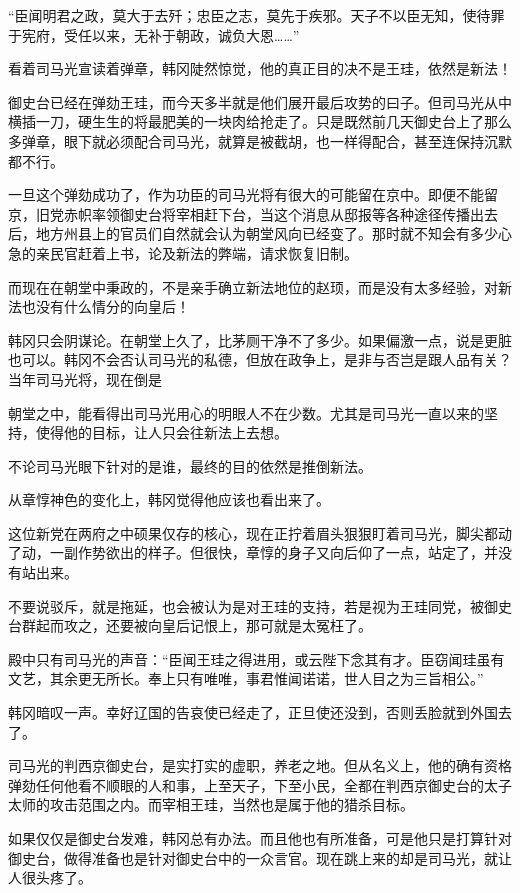 “臣闻明君之政，莫大于去歼；忠臣之志，莫先于疾邪。天子不以臣无知，使待罪于宪府，受任以来，无补于朝政，诚负大恩……”

看着司马光宣读着弹章，韩冈陡然惊觉，他的真正目的决不是王珪，依然是新法！

御史台已经在弹劾王珪，而今天多半就是他们展开最后攻势的曰子。但司马光从中横插一刀，硬生生的将最肥美的一块肉给抢走了。只是既然前几天御史台上了那么多弹章，眼下就必须配合司马光，就算是被截胡，也一样得配合，甚至连保持沉默都不行。

一旦这个弹劾成功了，作为功臣的司马光将有很大的可能留在京中。即便不能留京，旧党赤帜率领御史台将宰相赶下台，当这个消息从邸报等各种途径传播出去后，地方州县上的官员们自然就会认为朝堂风向已经变了。那时就不知会有多少心急的亲民官赶着上书，论及新法的弊端，请求恢复旧制。

而现在在朝堂中秉政的，不是亲手确立新法地位的赵顼，而是没有太多经验，对新法也没有什么情分的向皇后！

韩冈只会阴谋论。在朝堂上久了，比茅厕干净不了多少。如果偏激一点，说是更脏也可以。韩冈不会否认司马光的私德，但放在政争上，是非与否岂是跟人品有关？当年司马光将，现在倒是

朝堂之中，能看得出司马光用心的明眼人不在少数。尤其是司马光一直以来的坚持，使得他的目标，让人只会往新法上去想。

不论司马光眼下针对的是谁，最终的目的依然是推倒新法。

从章惇神色的变化上，韩冈觉得他应该也看出来了。

这位新党在两府之中硕果仅存的核心，现在正拧着眉头狠狠盯着司马光，脚尖都动了动，一副作势欲出的样子。但很快，章惇的身子又向后仰了一点，站定了，并没有站出来。

不要说驳斥，就是拖延，也会被认为是对王珪的支持，若是视为王珪同党，被御史台群起而攻之，还要被向皇后记恨上，那可就是太冤枉了。

殿中只有司马光的声音：“臣闻王珪之得进用，或云陛下念其有才。臣窃闻珪虽有文艺，其余更无所长。奉上只有唯唯，事君惟闻诺诺，世人目之为三旨相公。”

韩冈暗叹一声。幸好辽国的告哀使已经走了，正旦使还没到，否则丢脸就到外国去了。

司马光的判西京御史台，是实打实的虚职，养老之地。但从名义上，他的确有资格弹劾任何他看不顺眼的人和事，上至天子，下至小民，全都在判西京御史台的太子太师的攻击范围之内。而宰相王珪，当然也是属于他的猎杀目标。

如果仅仅是御史台发难，韩冈总有办法。而且他也有所准备，可是他只是打算针对御史台，做得准备也是针对御史台中的一众言官。现在跳上来的却是司马光，就让人很头疼了。

